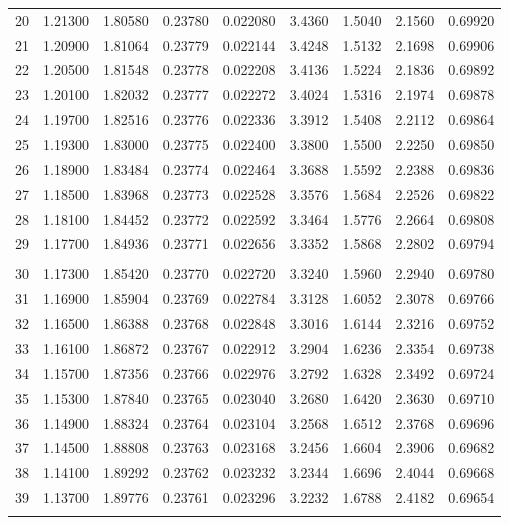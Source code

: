 \documentclass[letter,twosides,10pt]{article}
\begin{document}
\begin{longtable}{|c|c|c|c|c|c|c|c|c|}
 20 & 1.21300 & 1.80580 & 0.23780 & 0.022080 & 3.4360 & 1.5040 & 2.1560 & 0.69920 \\
 21 & 1.20900 & 1.81064 & 0.23779 & 0.022144 & 3.4248 & 1.5132 & 2.1698 & 0.69906 \\
 22 & 1.20500 & 1.81548 & 0.23778 & 0.022208 & 3.4136 & 1.5224 & 2.1836 & 0.69892 \\
 23 & 1.20100 & 1.82032 & 0.23777 & 0.022272 & 3.4024 & 1.5316 & 2.1974 & 0.69878 \\
 24 & 1.19700 & 1.82516 & 0.23776 & 0.022336 & 3.3912 & 1.5408 & 2.2112 & 0.69864 \\
 25 & 1.19300 & 1.83000 & 0.23775 & 0.022400 & 3.3800 & 1.5500 & 2.2250 & 0.69850 \\
 26 & 1.18900 & 1.83484 & 0.23774 & 0.022464 & 3.3688 & 1.5592 & 2.2388 & 0.69836 \\
 27 & 1.18500 & 1.83968 & 0.23773 & 0.022528 & 3.3576 & 1.5684 & 2.2526 & 0.69822 \\
 28 & 1.18100 & 1.84452 & 0.23772 & 0.022592 & 3.3464 & 1.5776 & 2.2664 & 0.69808 \\
 29 & 1.17700 & 1.84936 & 0.23771 & 0.022656 & 3.3352 & 1.5868 & 2.2802 & 0.69794 \\
 & & & & & & & & \\
 30 & 1.17300 & 1.85420 & 0.23770 & 0.022720 & 3.3240 & 1.5960 & 2.2940 & 0.69780 \\
 31 & 1.16900 & 1.85904 & 0.23769 & 0.022784 & 3.3128 & 1.6052 & 2.3078 & 0.69766 \\
 32 & 1.16500 & 1.86388 & 0.23768 & 0.022848 & 3.3016 & 1.6144 & 2.3216 & 0.69752 \\
 33 & 1.16100 & 1.86872 & 0.23767 & 0.022912 & 3.2904 & 1.6236 & 2.3354 & 0.69738 \\
 34 & 1.15700 & 1.87356 & 0.23766 & 0.022976 & 3.2792 & 1.6328 & 2.3492 & 0.69724 \\
 35 & 1.15300 & 1.87840 & 0.23765 & 0.023040 & 3.2680 & 1.6420 & 2.3630 & 0.69710 \\
 36 & 1.14900 & 1.88324 & 0.23764 & 0.023104 & 3.2568 & 1.6512 & 2.3768 & 0.69696 \\
 37 & 1.14500 & 1.88808 & 0.23763 & 0.023168 & 3.2456 & 1.6604 & 2.3906 & 0.69682 \\
 38 & 1.14100 & 1.89292 & 0.23762 & 0.023232 & 3.2344 & 1.6696 & 2.4044 & 0.69668 \\
 39 & 1.13700 & 1.89776 & 0.23761 & 0.023296 & 3.2232 & 1.6788 & 2.4182 & 0.69654 \\
 & & & & & & & & \\

\end{longtable}
\end{document}
